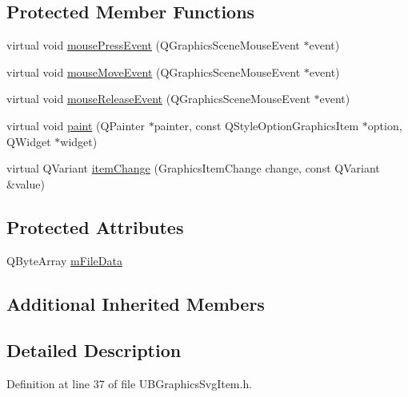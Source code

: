 \subsection*{Protected Member Functions}
\begin{DoxyCompactItemize}
\item 
virtual void \hyperlink{class_u_b_graphics_svg_item_aa9441d2e47ce0b11c5f360ff66ad0b68}{mouse\-Press\-Event} (Q\-Graphics\-Scene\-Mouse\-Event $\ast$event)
\item 
virtual void \hyperlink{class_u_b_graphics_svg_item_a957f4a1795a4113f1d61517fe752c628}{mouse\-Move\-Event} (Q\-Graphics\-Scene\-Mouse\-Event $\ast$event)
\item 
virtual void \hyperlink{class_u_b_graphics_svg_item_a01e9196ba8595cb8868fbff6d0a3d2d5}{mouse\-Release\-Event} (Q\-Graphics\-Scene\-Mouse\-Event $\ast$event)
\item 
virtual void \hyperlink{class_u_b_graphics_svg_item_aec5541da5dba9a214686b60670fd02d8}{paint} (Q\-Painter $\ast$painter, const Q\-Style\-Option\-Graphics\-Item $\ast$option, Q\-Widget $\ast$widget)
\item 
virtual Q\-Variant \hyperlink{class_u_b_graphics_svg_item_abb1e317552020abec0df6a1363773ffa}{item\-Change} (Graphics\-Item\-Change change, const Q\-Variant \&value)
\end{DoxyCompactItemize}
\subsection*{Protected Attributes}
\begin{DoxyCompactItemize}
\item 
Q\-Byte\-Array \hyperlink{class_u_b_graphics_svg_item_a3c8483b0bbddc94eec846f450735c13f}{m\-File\-Data}
\end{DoxyCompactItemize}
\subsection*{Additional Inherited Members}


\subsection{Detailed Description}


Definition at line 37 of file U\-B\-Graphics\-Svg\-Item.\-h.



